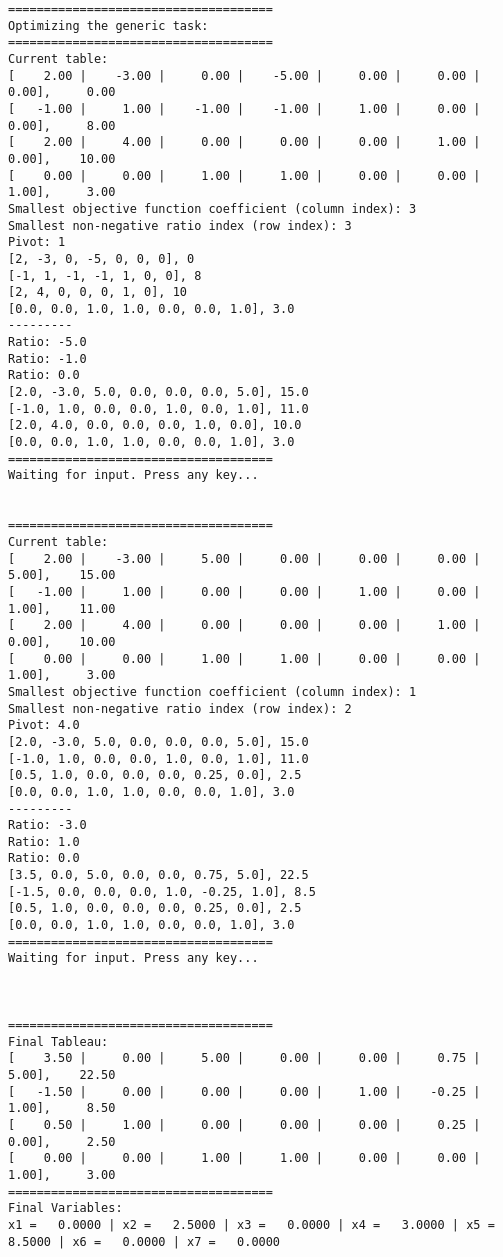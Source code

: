 \documentclass[a4paper,12pt,fleqn]{article}
\begin{document}
\begin{verbatim}
=====================================
Optimizing the generic task:
=====================================
Current table:
[    2.00 |    -3.00 |     0.00 |    -5.00 |     0.00 |     0.00 |     0.00],     0.00
[   -1.00 |     1.00 |    -1.00 |    -1.00 |     1.00 |     0.00 |     0.00],     8.00
[    2.00 |     4.00 |     0.00 |     0.00 |     0.00 |     1.00 |     0.00],    10.00
[    0.00 |     0.00 |     1.00 |     1.00 |     0.00 |     0.00 |     1.00],     3.00
Smallest objective function coefficient (column index): 3
Smallest non-negative ratio index (row index): 3
Pivot: 1
[2, -3, 0, -5, 0, 0, 0], 0
[-1, 1, -1, -1, 1, 0, 0], 8
[2, 4, 0, 0, 0, 1, 0], 10
[0.0, 0.0, 1.0, 1.0, 0.0, 0.0, 1.0], 3.0
---------
Ratio: -5.0
Ratio: -1.0
Ratio: 0.0
[2.0, -3.0, 5.0, 0.0, 0.0, 0.0, 5.0], 15.0
[-1.0, 1.0, 0.0, 0.0, 1.0, 0.0, 1.0], 11.0
[2.0, 4.0, 0.0, 0.0, 0.0, 1.0, 0.0], 10.0
[0.0, 0.0, 1.0, 1.0, 0.0, 0.0, 1.0], 3.0
=====================================
Waiting for input. Press any key...


=====================================
Current table:
[    2.00 |    -3.00 |     5.00 |     0.00 |     0.00 |     0.00 |     5.00],    15.00
[   -1.00 |     1.00 |     0.00 |     0.00 |     1.00 |     0.00 |     1.00],    11.00
[    2.00 |     4.00 |     0.00 |     0.00 |     0.00 |     1.00 |     0.00],    10.00
[    0.00 |     0.00 |     1.00 |     1.00 |     0.00 |     0.00 |     1.00],     3.00
Smallest objective function coefficient (column index): 1
Smallest non-negative ratio index (row index): 2
Pivot: 4.0
[2.0, -3.0, 5.0, 0.0, 0.0, 0.0, 5.0], 15.0
[-1.0, 1.0, 0.0, 0.0, 1.0, 0.0, 1.0], 11.0
[0.5, 1.0, 0.0, 0.0, 0.0, 0.25, 0.0], 2.5
[0.0, 0.0, 1.0, 1.0, 0.0, 0.0, 1.0], 3.0
---------
Ratio: -3.0
Ratio: 1.0
Ratio: 0.0
[3.5, 0.0, 5.0, 0.0, 0.0, 0.75, 5.0], 22.5
[-1.5, 0.0, 0.0, 0.0, 1.0, -0.25, 1.0], 8.5
[0.5, 1.0, 0.0, 0.0, 0.0, 0.25, 0.0], 2.5
[0.0, 0.0, 1.0, 1.0, 0.0, 0.0, 1.0], 3.0
=====================================
Waiting for input. Press any key...



=====================================
Final Tableau:
[    3.50 |     0.00 |     5.00 |     0.00 |     0.00 |     0.75 |     5.00],    22.50
[   -1.50 |     0.00 |     0.00 |     0.00 |     1.00 |    -0.25 |     1.00],     8.50
[    0.50 |     1.00 |     0.00 |     0.00 |     0.00 |     0.25 |     0.00],     2.50
[    0.00 |     0.00 |     1.00 |     1.00 |     0.00 |     0.00 |     1.00],     3.00
=====================================
Final Variables: 
x1 =   0.0000 | x2 =   2.5000 | x3 =   0.0000 | x4 =   3.0000 | x5 =   8.5000 | x6 =   0.0000 | x7 =   0.0000


\end{verbatim}
\end{document}
